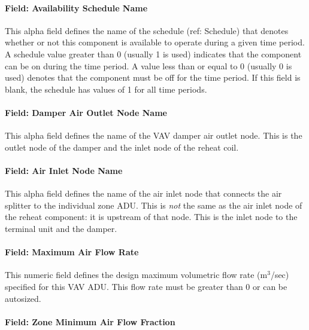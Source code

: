 \paragraph{Field: Availability Schedule Name}\label{field-availability-schedule-name-4}

This alpha field defines the name of the schedule (ref: Schedule) that denotes whether or not this component is available to operate during a given time period. A schedule value greater than 0 (usually 1 is used) indicates that the component can be on during the time period. A value less than or equal to 0 (usually 0 is used) denotes that the component must be off for the time period. If this field is blank, the schedule has values of 1 for all time periods.

\paragraph{Field: Damper Air Outlet Node Name}\label{field-damper-air-outlet-node-name-1}

This alpha field defines the name of the VAV damper air outlet node. This is the outlet node of the damper and the inlet node of the reheat coil.

\paragraph{Field: Air Inlet Node Name}\label{field-air-inlet-node-name-3}

This alpha field defines the name of the air inlet node that connects the air splitter to the individual zone ADU. This is \emph{not} the same as the air inlet node of the reheat component: it is upstream of that node. This is the inlet node to the terminal unit and the damper.

\paragraph{Field: Maximum Air Flow Rate}\label{field-maximum-air-flow-rate-3}

This numeric field defines the design maximum volumetric flow rate (m\(^{3}\)/sec) specified for this VAV ADU. This flow rate must be greater than 0 or can be autosized.

\paragraph{Field: Zone Minimum Air Flow Fraction}\label{field-zone-minimum-air-flow-fraction-1}

